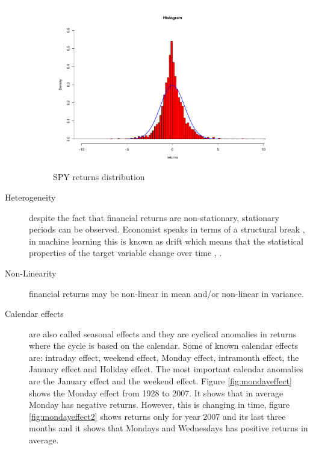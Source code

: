 \begin{description}
\begin{figure}[h]
 \includegraphics[scale=0.5]{plots/spy_returns_dist.pdf}
 \caption{SPY returns distribution}
 \label{fig:returndist}
\end{figure}
\item[Heterogeneity] despite the fact that financial returns are non-stationary,
stationary periods can be observed. Economist speaks in terms of a structural
break \cite{stock1994}, in machine learning this is known as drift which means
that the statistical properties of the target variable change over time
\cite{widmer1996}, \cite{tsymbal2004}.
\item[Non-Linearity] financial returns may be non-linear in mean and/or
non-linear in variance.
\item[Calendar effects] are also called seasonal effects and they are cyclical
anomalies in returns where the cycle is based on the calendar. Some of known
calendar effects are: intraday effect, weekend effect, Monday effect, intramonth
effect, the January effect and Holiday effect. The most important calendar
anomalies are the January effect and the weekend effect. Figure
\ref{fig:mondayeffect} shows the Monday effect from 1928 to 2007. It shows that
in average Monday has negative returns. However, this is changing in time,
figure \ref{fig:mondayeffect2} shows returns only for year 2007 and its last
three months and it shows that Mondays and Wednesdays has positive returns in
average.


\end{description}
